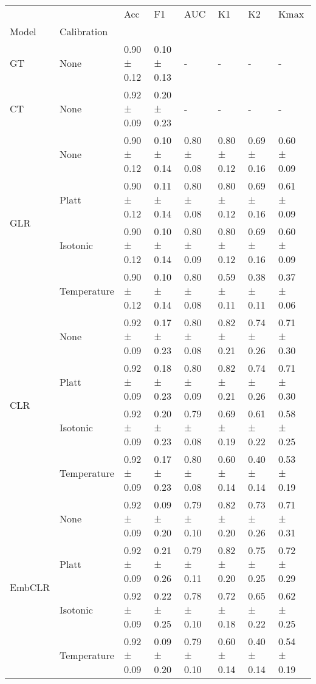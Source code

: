 \begin{tabular}{llllllll}
\toprule
 &  & Acc & F1 & AUC & K1 & K2 & Kmax \\
Model & Calibration &  &  &  &  &  &  \\
\midrule
GT & None & 0.90 ± 0.12 & 0.10 ± 0.13 & - & - & - & - \\
\cline{1-8}
CT & None & 0.92 ± 0.09 & 0.20 ± 0.23 & - & - & - & - \\
\cline{1-8}
\multirow[t]{4}{*}{GLR} & None & 0.90 ± 0.12 & 0.10 ± 0.14 & 0.80 ± 0.08 & 0.80 ± 0.12 & 0.69 ± 0.16 & 0.60 ± 0.09 \\
 & Platt & 0.90 ± 0.12 & 0.11 ± 0.14 & 0.80 ± 0.08 & 0.80 ± 0.12 & 0.69 ± 0.16 & 0.61 ± 0.09 \\
 & Isotonic & 0.90 ± 0.12 & 0.10 ± 0.14 & 0.80 ± 0.09 & 0.80 ± 0.12 & 0.69 ± 0.16 & 0.60 ± 0.09 \\
 & Temperature & 0.90 ± 0.12 & 0.10 ± 0.14 & 0.80 ± 0.08 & 0.59 ± 0.11 & 0.38 ± 0.11 & 0.37 ± 0.06 \\
\cline{1-8}
\multirow[t]{4}{*}{CLR} & None & 0.92 ± 0.09 & 0.17 ± 0.23 & 0.80 ± 0.08 & 0.82 ± 0.21 & 0.74 ± 0.26 & 0.71 ± 0.30 \\
 & Platt & 0.92 ± 0.09 & 0.18 ± 0.23 & 0.80 ± 0.09 & 0.82 ± 0.21 & 0.74 ± 0.26 & 0.71 ± 0.30 \\
 & Isotonic & 0.92 ± 0.09 & 0.20 ± 0.23 & 0.79 ± 0.08 & 0.69 ± 0.19 & 0.61 ± 0.22 & 0.58 ± 0.25 \\
 & Temperature & 0.92 ± 0.09 & 0.17 ± 0.23 & 0.80 ± 0.08 & 0.60 ± 0.14 & 0.40 ± 0.14 & 0.53 ± 0.19 \\
\cline{1-8}
\multirow[t]{4}{*}{EmbCLR} & None & 0.92 ± 0.09 & 0.09 ± 0.20 & 0.79 ± 0.10 & 0.82 ± 0.20 & 0.73 ± 0.26 & 0.71 ± 0.31 \\
 & Platt & 0.92 ± 0.09 & 0.21 ± 0.26 & 0.79 ± 0.11 & 0.82 ± 0.20 & 0.75 ± 0.25 & 0.72 ± 0.29 \\
 & Isotonic & 0.92 ± 0.09 & 0.22 ± 0.25 & 0.78 ± 0.10 & 0.72 ± 0.18 & 0.65 ± 0.22 & 0.62 ± 0.25 \\
 & Temperature & 0.92 ± 0.09 & 0.09 ± 0.20 & 0.79 ± 0.10 & 0.60 ± 0.14 & 0.40 ± 0.14 & 0.54 ± 0.19 \\
\cline{1-8}
\bottomrule
\end{tabular}
